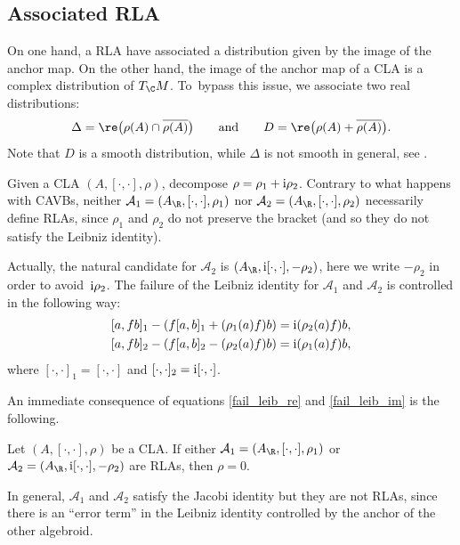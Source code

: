 \subsection{Associated RLA}%
On one hand, a RLA have associated a distribution given by the image of the anchor map. On the other hand, the image of the anchor map of a CLA is a complex distribution of $T_{\C}M$. To~bypass this issue, we associate two real distributions:
\begin{equation}\label{real_distributions}
\Delta=\re \bigl(\rho(A)\cap \overline{\rho(A)}\bigr)\qquad\text{and} \qquad D=\re \bigl(\rho(A) + \overline{\rho(A)}\bigr).
\end{equation}
Note that $D$ is a smooth distribution, while $\Delta$ is not smooth in general, see \cite[Example 6.1]{aguero2022complex}.

Given a CLA $(A, [\cdot,\cdot], \rho)$, decompose $\rho=\rho_1+{\rm i}\rho_2$. Contrary to what happens with CAVBs, neither $\mathcal{A}_1=(A_{\R}, [\cdot,\cdot], \rho_1)$ nor $\mathcal{A}_2=(A_{\R}, [\cdot,\cdot],\rho_2)$ necessarily define RLAs, since $\rho_1$ and $\rho_2$ do not preserve the bracket (and so they do not satisfy the Leibniz identity).


Actually, the natural candidate for $\mathcal{A}_2$ is $(A_{\R}, {\rm i}[\cdot,\cdot], -\rho_2)$, here we write $-\rho_2$ in order to avoid~${\rm i}\rho_2$. The failure of the Leibniz identity for $\mathcal{A}_1$ and $\mathcal{A}_2$ is controlled in the following way:
  \begin{gather}\label{fail_leib_re}
  [a, fb]_1-(f[a,b]_1+(\rho_1(a)f)b)={\rm i}(\rho_2(a)f)b,
  \\ \label{fail_leib_im}
  [a, fb]_2-(f[a,b]_2-(\rho_2(a)f)b)={\rm i}(\rho_1(a)f)b,
  \end{gather}
  where $[\cdot,\cdot]_1=[\cdot,\cdot]$ and $[\cdot,\cdot]_2={\rm i}[\cdot,\cdot]$.

An immediate consequence of equations \eqref{fail_leib_re} and \eqref{fail_leib_im} is the following.
\begin{Proposition}
Let $(A, [\cdot,\cdot], \rho)$ be a CLA. If either $\mathcal{A}_1=(A_{\R}, [\cdot,\cdot], \rho_1)$ or $\mathcal{A}_2=(A_{\R}, {\rm i}[\cdot,\cdot], -\rho_2)$ are RLAs, then $\rho=0$.
\end{Proposition}

In general, $\mathcal{A}_1$ and $\mathcal{A}_2$ satisfy the Jacobi identity but they are not RLAs, since there is an ``error term'' in the Leibniz identity controlled by the anchor of the other algebroid.

